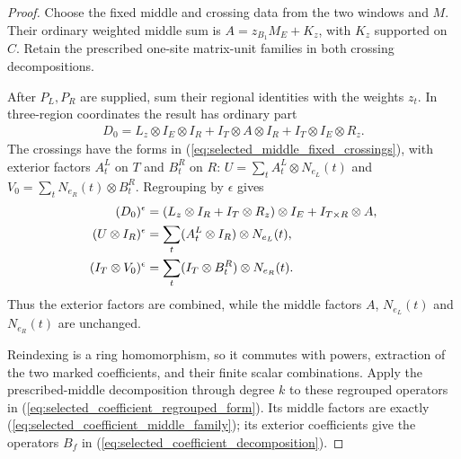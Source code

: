 \begin{proof}\leanok
    Choose the fixed middle and crossing data from the two windows and $M$.
    Their ordinary weighted middle sum is $A=z_{B_1}M_E+K_z$, with $K_z$
    supported on $C$. Retain the prescribed one-site matrix-unit families in
    both crossing decompositions.

    After $P_L,P_R$ are supplied, sum their regional identities with the
    weights $z_t$. In three-region coordinates the result has ordinary part
    \begin{align}
        D_0=L_z\otimes I_E\otimes I_R
        +I_T\otimes A\otimes I_R
        +I_T\otimes I_E\otimes R_z.
        \label{eq:selected_coefficient_ordinary_form}
    \end{align}
    The crossings have the forms in
    (\ref{eq:selected_middle_fixed_crossings}), with exterior factors
    $A^L_t$ on $T$ and $B^R_t$ on $R$:
    $U=\sum_tA^L_t\otimes N_{e_L}(t)$ and
    $V_0=\sum_tN_{e_R}(t)\otimes B^R_t$. Regrouping by $\epsilon$ gives
    \begin{align}
        (D_0)^\epsilon            & =(L_z\otimes I_R+I_T\otimes R_z)\otimes I_E
        +I_{T\times R}\otimes A,\notag                                           \\
        (U\otimes I_R)^\epsilon   & =\sum_t(A^L_t\otimes I_R)\otimes N_{e_L}(t),
        \notag                                                                   \\
        (I_T\otimes V_0)^\epsilon & =\sum_t(I_T\otimes B^R_t)\otimes N_{e_R}(t).
        \label{eq:selected_coefficient_regrouped_form}
    \end{align}
    Thus the exterior factors are combined, while the middle factors $A$,
    $N_{e_L}(t)$ and $N_{e_R}(t)$ are unchanged.

    Reindexing is a ring homomorphism, so it commutes with powers, extraction
    of the two marked coefficients, and their finite scalar combinations.
    Apply the prescribed-middle decomposition through degree $k$ to these
    regrouped operators in (\ref{eq:selected_coefficient_regrouped_form}). Its middle factors are exactly
    (\ref{eq:selected_coefficient_middle_family}); its exterior coefficients
    give the operators $B_f$ in (\ref{eq:selected_coefficient_decomposition}).
\end{proof}
